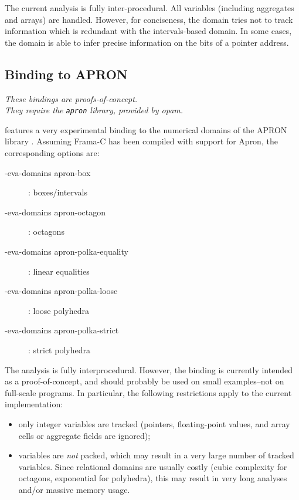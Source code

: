 \documentclass{frama-c-book}
\begin{document}
The current analysis is fully inter-procedural. All variables (including
aggregates and arrays) are handled. However, for conciseness, the domain tries
not to track information which is redundant with the intervals-based domain. In
some cases, the domain is able to infer precise information on the bits of a
pointer address.

\subsection{Binding to APRON}
\label{sec:apron}

\emph{These bindings are proofs-of-concept.\\
  They require the \texttt{apron} library, provided by opam.}

\Eva{} features a very experimental binding to the numerical domains of
the APRON library \cite{DBLP:conf/cav/JeannetM09}. Assuming Frama-C has been
compiled with support for Apron, the corresponding options are:

\begin{description}
\item[-eva-domains apron-box]: boxes/intervals
\item[-eva-domains apron-octagon]:  octagons
\item[-eva-domains apron-polka-equality]:  linear equalities
\item[-eva-domains apron-polka-loose]: loose polyhedra
\item[-eva-domains apron-polka-strict]: strict polyhedra
\end{description}

The analysis is fully interprocedural. However, the binding is
currently intended as a proof-of-concept, and should probably be used
on small examples--not on full-scale programs. In particular, the
following restrictions apply to the current implementation:
\begin{itemize}
\item only integer variables are tracked (pointers, floating-point values,
  and array cells or aggregate fields are ignored);

\item variables are \emph{not} packed, which may result in a very large
number of tracked variables. Since relational domains are usually costly
(cubic complexity for octagons, exponential for polyhedra), this may result
in very long analyses and/or massive memory usage.

\end{itemize}
\end{document}
